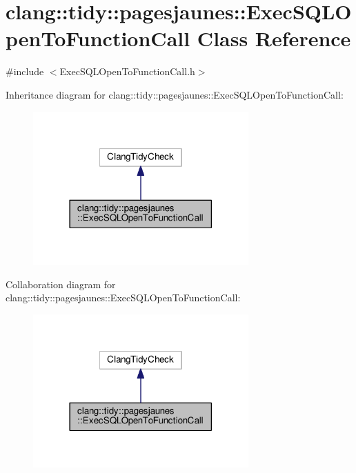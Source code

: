 \hypertarget{classclang_1_1tidy_1_1pagesjaunes_1_1_exec_s_q_l_open_to_function_call}{}\section{clang\+:\+:tidy\+:\+:pagesjaunes\+:\+:Exec\+S\+Q\+L\+Open\+To\+Function\+Call Class Reference}
\label{classclang_1_1tidy_1_1pagesjaunes_1_1_exec_s_q_l_open_to_function_call}


{\ttfamily \#include $<$Exec\+S\+Q\+L\+Open\+To\+Function\+Call.\+h$>$}



Inheritance diagram for clang\+:\+:tidy\+:\+:pagesjaunes\+:\+:Exec\+S\+Q\+L\+Open\+To\+Function\+Call\+:
\nopagebreak
\begin{figure}[H]
\begin{center}
\leavevmode
\includegraphics[width=234pt]{classclang_1_1tidy_1_1pagesjaunes_1_1_exec_s_q_l_open_to_function_call__inherit__graph}
\end{center}
\end{figure}


Collaboration diagram for clang\+:\+:tidy\+:\+:pagesjaunes\+:\+:Exec\+S\+Q\+L\+Open\+To\+Function\+Call\+:
\nopagebreak
\begin{figure}[H]
\begin{center}
\leavevmode
\includegraphics[width=234pt]{classclang_1_1tidy_1_1pagesjaunes_1_1_exec_s_q_l_open_to_function_call__coll__graph}
\end{center}
\end{figure}

